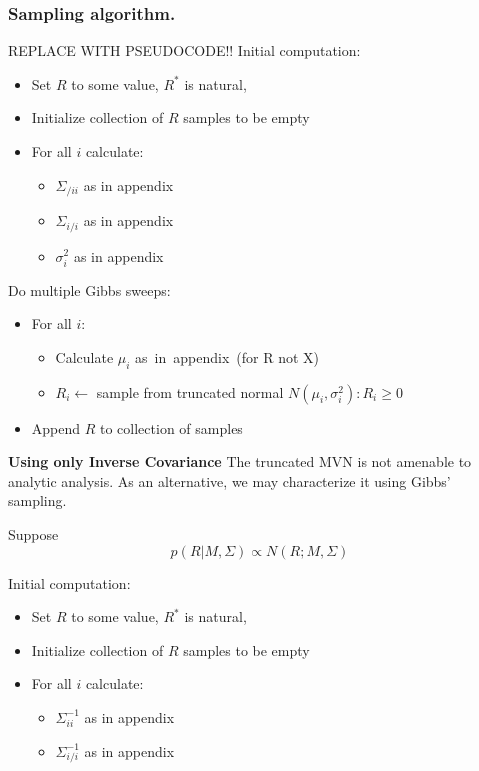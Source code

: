 \documentclass{article}
\begin{document}
\subsubsection{Sampling algorithm.}
REPLACE WITH PSEUDOCODE!!
Initial computation:
\begin{itemize}
  \item Set $R$ to some value, $R^*$ is natural,
  \item Initialize collection of $R$ samples to be empty
  \item For all $i$ calculate:
    \begin{itemize}
      \item  $\Sigma_{/ii}$ as in appendix
      \item  $\Sigma_{i/i}$ as in appendix
      \item  $\sigma^2_i$ as in appendix
    \end{itemize}  
\end{itemize}


Do multiple Gibbs sweeps:
\begin{itemize}
  \item For all $i$:
  \begin{itemize}
    \item Calculate $\mu_i$ \mbox{as in appendix (for} R \mbox{not} X)
    \item $R_i \leftarrow$ sample from truncated normal $N(\mu_i, \sigma^2_i) : R_i \geq 0$
  \end{itemize}
  \item Append $R$ to collection of samples
\end{itemize}

\textbf{Using only Inverse Covariance}
The truncated MVN is not amenable to analytic analysis.
As an alternative, we may characterize it using Gibbs' sampling.

Suppose
\begin{equation}
  p(R|M, \Sigma) \propto  N(R; M, \Sigma)
\end{equation}

Initial computation:
\begin{itemize}
  \item Set $R$ to some value, $R^*$ is natural,
  \item Initialize collection of $R$ samples to be empty
  \item For all $i$ calculate:
    \begin{itemize}
      \item  $\Sigma^{-1}_{ii}$ as in appendix
      \item  $\Sigma^{-1}_{i/i}$ as in appendix
    \end{itemize}  
\end{itemize}
\end{document}
